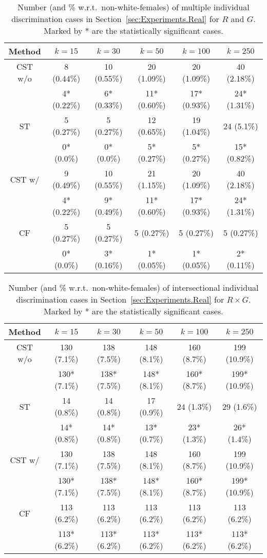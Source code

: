 %
\begin{table}[t]
  \caption{Number (and \% w.r.t.~non-white-females) of multiple individual discrimination cases in Section~\ref{sec:Experiments.Real} for $R$ and $G$. Marked by * are the statistically significant cases.}
  \label{table:k-results_Multiple}
  \centering
  \begin{tabular}{cccccc}
    \toprule
    Method & $k=15$ & $k=30$ & $k=50$ & $k=100$ & $k=250$\\
    \midrule
    CST w/o & 8 (0.44\%) & 10 (0.55\%) & 20 (1.09\%) & 20 (1.09\%)  & 40 (2.18\%) \\
     & 4* (0.22\%) & 6* (0.33\%) & 11* (0.60\%) & 17* (0.93\%)  & 24* (1.31\%) \\
     \midrule
    ST & 5 (0.27\%) & 5 (0.27\%) & 12 (0.65\%) & 19 (1.04\%) & 24 (5.1\%) \\
    & 0* (0.0\%) & 0* (0.0\%) & 5* (0.27\%) & 5* (0.27\%)  & 15* (0.82\%) \\
    \midrule
    CST w/ & 9 (0.49\%) & 10 (0.55\%) & 21 (1.15\%) & 20 (1.09\%)  & 40 (2.18\%)\\
    & 4* (0.22\%) & 9* (0.49\%) & 11* (0.60\%) & 17* (0.93\%)  & 24* (1.31\%) \\
    \midrule
    CF & 5 (0.27\%) & 5 (0.27\%) & 5 (0.27\%) & 5 (0.27\%) & 5 (0.27\%) \\
    & 0* (0.0\%) & 3* (0.16\%) & 1* (0.05\%) & 1* (0.05\%) & 2* (0.11\%) \\
    \bottomrule
  \end{tabular}
\end{table}
%

%
\begin{table}[t]
  \caption{Number (and \% w.r.t.~non-white-females) of intersectional individual discrimination cases in Section~\ref{sec:Experiments.Real} for $R \times G$. Marked by * are the statistically significant cases.}
  \label{table:k-results_Intersectional}
  \centering
  \begin{tabular}{cccccc}
    \toprule
    Method & $k=15$ & $k=30$ & $k=50$ & $k=100$ & $k=250$\\
    \midrule
    CST w/o & 130 (7.1\%) & 138 (7.5\%) & 148 (8.1\%) & 160 (8.7\%)  & 199 (10.9\%) \\
    & 130* (7.1\%) & 138* (7.5\%) & 148* (8.1\%) & 160* (8.7\%)  & 199* (10.9\%) \\
     \midrule
    ST & 14 (0.8\%) & 14 (0.8\%) & 17 (0.9\%) & 24 (1.3\%) & 29 (1.6\%) \\
    & 14* (0.8\%) & 14* (0.8\%) & 13* (0.7\%) & 23* (1.3\%)  & 26* (1.4\%) \\
    \midrule
    CST w/ & 130 (7.1\%) & 138 (7.5\%) & 148 (8.1\%) & 160 (8.7\%)  & 199 (10.9\%) \\
    & 130* (7.1\%) & 138* (7.5\%) & 148* (8.1\%) & 160* (8.7\%)  & 199* (10.9\%) \\
    \midrule
    CF & 113 (6.2\%) & 113 (6.2\%) & 113 (6.2\%) & 113 (6.2\%) & 113 (6.2\%) \\
    & 113* (6.2\%) & 113* (6.2\%) & 113* (6.2\%) & 113* (6.2\%) & 113* (6.2\%) \\
    \bottomrule
  \end{tabular}
\end{table}
%

